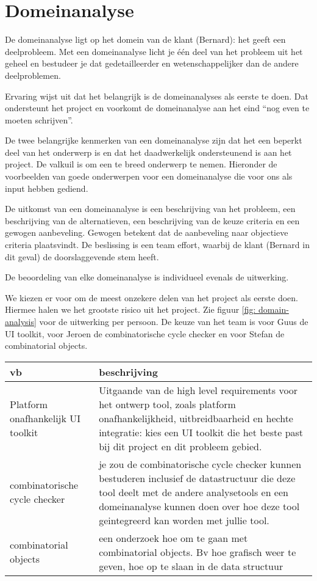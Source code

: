 
\section{Domeinanalyse}

De domeinanalyse ligt op het domein van de klant (Bernard): het geeft een
deelprobleem. Met een domeinanalyse licht je
\'e\'en deel van het probleem uit het geheel en bestudeer je dat gedetailleerder
en wetenschappelijker dan de andere deelproblemen.

Ervaring wijst uit dat het belangrijk is de domeinanalyses als eerste te doen.
Dat ondersteunt het project en voorkomt
de domeinanalyse aan het eind ``nog even te moeten schrijven''.

De twee belangrijke kenmerken van een domeinanalyse zijn dat het een beperkt
deel van het onderwerp is en dat het daadwerkelijk
ondersteunend is aan het project. De valkuil is om een te breed onderwerp te
nemen. Hieronder de voorbeelden van goede onderwerpen
voor een domeinanalyse die voor ons als input hebben gediend.

De uitkomst van een domeinanalyse is een beschrijving van het probleem,
een beschrijving van de alternatieven, een beschrijving van de keuze criteria en
een gewogen aanbeveling. Gewogen betekent dat de aanbeveling naar objectieve
criteria plaatsvindt.
De beslissing is een team effort, waarbij de klant (Bernard in dit geval)
de doorslaggevende stem heeft.

De beoordeling van elke domeinanalyse is individueel evenals de uitwerking.

We kiezen er voor om de meest onzekere delen van het project als eerste doen.
Hiermee halen we het grootste risico uit het
project. Zie figuur \ref{fig: domain-analysis} voor de uitwerking per persoon.
De keuze van het team is voor Guus de UI toolkit, voor Jeroen de combinatorische
cycle checker en voor Stefan de combinatorial objects.

\begin{center}
    \begin{tabular}{|p{2.5cm}|p{10cm}|}
    \hline
        {\bf vb}		& {\bf beschrijving} \\\hline
        Platform onafhankelijk UI toolkit & Uitgaande van de high level
requirements voor het ontwerp
					    tool, zoals platform
onafhankelijkheid, uitbreidbaarheid
					    en hechte integratie: kies een UI
toolkit die het
					    beste past bij dit project en dit
probleem gebied.\\\hline
        combinatorische cycle checker & je zou de combinatorische cycle checker
kunnen bestuderen inclusief de datastructuur die
					deze tool deelt met de andere
analysetools en een domeinanalyse kunnen doen
					over hoe deze tool geintegreerd kan
worden met jullie tool.\\\hline
        combinatorial objects &  een onderzoek hoe om te gaan met combinatorial
objects.
				    Bv hoe grafisch weer te geven, hoe op te
slaan in de data structuur\\\hline
    \end{tabular}
\end{center}



